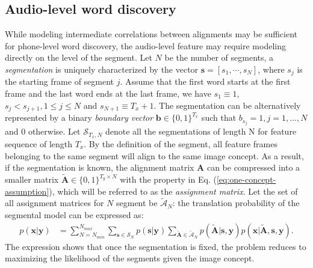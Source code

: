 \documentclass[journal]{IEEEtran}
\begin{document}
\subsection{Audio-level word discovery}
While modeling intermediate correlations between alignments may be sufficient for phone-level word discovery, the audio-level feature may require modeling directly on the level of the segment. Let $N$ be the number of segments, a \textit{segmentation} is uniquely characterized by the vector $\mathbf s = [s_1, \cdots, s_N]$, where $s_j$ is the starting frame of segment $j$. Assume that the first word starts at the first frame and the last word ends at the last frame, we have $s_1 \equiv 1$, $s_j < s_{j+1}, 1\leq j \leq N$ and $s_{N+1} \equiv T_x+1$. The segmentation can be alternatively represented by a binary \textit{boundary vector} $\mathbf b \in \{0, 1\}^{T_x}$ such that $b_{s_j}=1, j=1,\ldots,N$ and 0 otherwise. Let $\mathcal S_{T_x, N}$ denote all the segmentations of length N for feature sequence of length $T_x$. By the definition of the segment, all feature frames belonging to the same segment will align to the same image concept. As a result, if the segmentation is known, the alignment matrix $\mathbf A$ can be compressed into a smaller matrix $\tilde{\mathbf{A}} \in \{0, 1\}^{T_y \times N}$ with the property in Eq. (\ref{eq:one-concept-assumption}), which will be referred to as the \textit{assignment matrix}. Let the set of all assignment matrices for $N$ segment be $\tilde{\mathcal A}_N$: the translation probability of the segmental model can be expressed as:
\begin{align}\label{eq:trans_prob_segmental}
    p(\mathbf x|\mathbf y) &= \sum_{N=N_{min}}^{N_{max}} \sum_{\mathbf s \in \mathcal S_N} p(\mathbf s|\mathbf y)\sum_{\tilde{\mathbf{A}} \in \tilde{\mathcal A}_N} p(\tilde{\mathbf{A}}| \mathbf s, \mathbf y) p(\mathbf x|\tilde{\mathbf A}, \mathbf s, \mathbf y).
\end{align}
The expression shows that once the segmentation is fixed, the problem reduces to maximizing the likelihood of the segments given the image concept.
\end{document}
